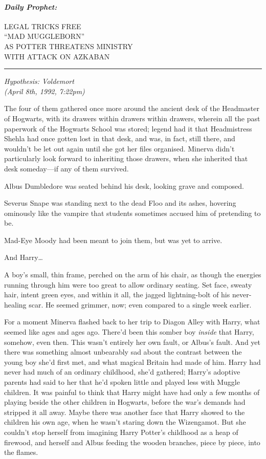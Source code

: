 \paragraph{\emph{Daily Prophet:}}\label{daily-prophet}

LEGAL TRICKS FREE\\``MAD MUGGLEBORN''\\AS POTTER THREATENS
MINISTRY\\WITH ATTACK ON AZKABAN

\begin{center}\rule{3in}{0.4pt}\end{center}

\emph{Hypothesis: Voldemort}\\\emph{(April 8th, 1992, 7:22pm)}

The four of them gathered once more around the ancient desk of the
Headmaster of Hogwarts, with its drawers within drawers within drawers,
wherein all the past paperwork of the Hogwarts School was stored; legend
had it that Headmistress Shehla had once gotten lost in that desk, and
was, in fact, still there, and wouldn't be let out again until she got
her files organised. Minerva didn't particularly look forward to
inheriting those drawers, when she inherited that desk someday---if any
of them survived.

Albus Dumbledore was seated behind his desk, looking grave and composed.

Severus Snape was standing next to the dead Floo and its ashes, hovering
ominously like the vampire that students sometimes accused him of
pretending to be.

Mad-Eye Moody had been meant to join them, but was yet to arrive.

And Harry\ldots{}

A boy's small, thin frame, perched on the arm of his chair, as though
the energies running through him were too great to allow ordinary
seating. Set face, sweaty hair, intent green eyes, and within it all,
the jagged lightning-bolt of his never-healing scar. He seemed grimmer,
now; even compared to a single week earlier.

For a moment Minerva flashed back to her trip to Diagon Alley with
Harry, what seemed like ages and ages ago. There'd been this somber boy
\emph{inside} that Harry, somehow, even then. This wasn't entirely her
own fault, or Albus's fault. And yet there was something almost
unbearably sad about the contrast between the young boy she'd first met,
and what magical Britain had made of him. Harry had never had much of an
ordinary childhood, she'd gathered; Harry's adoptive parents had said to
her that he'd spoken little and played less with Muggle children. It was
painful to think that Harry might have had only a few months of playing
beside the other children in Hogwarts, before the war's demands had
stripped it all away. Maybe there was another face that Harry showed to
the children his own age, when he wasn't staring down the Wizengamot.
But she couldn't stop herself from imagining Harry Potter's childhood as
a heap of firewood, and herself and Albus feeding the wooden branches,
piece by piece, into the flames.

